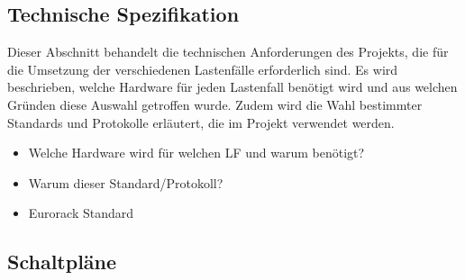 \newpage
\subsection{Technische Spezifikation}
Dieser Abschnitt behandelt die technischen Anforderungen des Projekts, die für die Umsetzung der verschiedenen Lastenfälle erforderlich sind. Es wird beschrieben, welche Hardware für jeden Lastenfall benötigt wird und aus welchen Gründen diese Auswahl getroffen wurde. Zudem wird die Wahl bestimmter Standards und Protokolle erläutert, die im Projekt verwendet werden.

\begin{itemize}
    \item Welche Hardware wird für welchen LF und warum benötigt?
    \item Warum dieser Standard/Protokoll?
    \item Eurorack Standard
\end{itemize}




\subsection{Schaltpläne}


\begin{figure}[ht]
	\centering
	
	\label{fig:audio_test_schematic}
\end{figure}

\newpage
\begin{figure}[ht]
	\centering
	
	\label{fig:interface_test_schematic}
\end{figure}